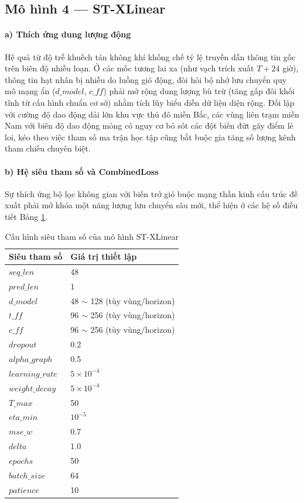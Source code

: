 \subsection{Mô hình 4 --- ST-XLinear}

\paragraph{a) Thích ứng dung lượng động}

Hệ quả từ độ trễ khuếch tán không khí khống chế tỷ lệ truyền dẫn thông tin gốc trên biên độ nhiễu loạn. Ở các mốc tương lai xa (như vạch trích xuất $T+24$ giờ), thông tin hạt nhân bị nhiễu do luồng gió động, đòi hỏi bộ nhớ lưu chuyển quy mô mạng ẩn ($d\_model$, $c\_ff$) phải mở rộng dung lượng bù trừ (tăng gấp đôi khối tĩnh từ cấu hình chuẩn cơ sở) nhằm tích lũy biểu diễn dữ liệu diện rộng. Đối lập với cường độ dao động dải lớn khu vực thủ đô miền Bắc, các vùng liên trạm miền Nam với biên độ dao động mỏng có nguy cơ bỏ sót các đột biến đứt gãy điểm lẻ loi, kéo theo việc tham số ma trận học tập cũng bắt buộc gia tăng số lượng kênh tham chiếu chuyên biệt.

\paragraph{b) Hệ siêu tham số và CombinedLoss}

Sự thích ứng bộ lọc không gian với biến trở gió buộc mạng thần kinh cấu trúc đề xuất phải mở khóa một năng lượng lưu chuyển sâu mới, thể hiện ở các hệ số điều tiết Bảng \ref{tab:stxlinear_params_ch2}.

\begin{table}[H]
    \centering
    \caption{Cấu hình siêu tham số của mô hình ST-XLinear}
    \label{tab:stxlinear_params_ch2}
    \renewcommand{\arraystretch}{1.3}
    \begin{tabular}{p{5.5cm} p{8.8cm}}
    \toprule
    \textbf{Siêu tham số} & \textbf{Giá trị thiết lập} \\
    \midrule
    $seq\_len$ & 48 \\
    $pred\_len$ & 1 \\
    $d\_model$ & 48 $\sim$ 128 (tùy vùng/horizon) \\
    $t\_ff$ & 96 $\sim$ 256 (tùy vùng/horizon) \\
    $c\_ff$ & 96 $\sim$ 256 (tùy vùng/horizon) \\
    $dropout$ & 0.2 \\
    $alpha\_graph$ & 0.5 \\
    $learning\_rate$ & $5 \times 10^{-4}$ \\
    $weight\_decay$ & $5 \times 10^{-4}$ \\
    $T\_max$ & 50 \\
    $eta\_min$ & $10^{-5}$ \\
    $mse\_w$ & 0.7 \\
    $delta$ & 1.0 \\
    $epochs$ & 50 \\
    $batch\_size$ & 64 \\
    $patience$ & 10 \\
    \bottomrule
    \end{tabular}
\end{table}

